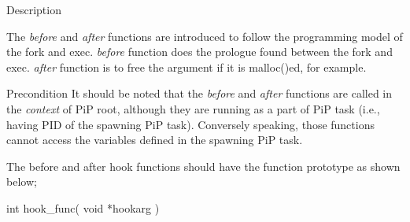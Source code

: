 \documentclass[twoside]{book}
\begin{document}
\begin{DoxyParagraph}{Description}

\end{DoxyParagraph}
The {\itshape before} and {\itshape after} functions are introduced to follow the programming model of the {\ttfamily fork} and {\ttfamily exec}. {\itshape before} function does the prologue found between the {\ttfamily fork} and {\ttfamily exec}. {\itshape after} function is to free the argument if it is {\ttfamily malloc()ed}, for example. \begin{DoxyPrecond}{Precondition}
It should be noted that the {\itshape before} and {\itshape after} functions are called in the {\itshape context} of Pi\-P root, although they are running as a part of Pi\-P task (i.\-e., having P\-I\-D of the spawning Pi\-P task). Conversely speaking, those functions cannot access the variables defined in the spawning Pi\-P task. 

The before and after hook functions should have the function prototype as shown below; 
\begin{DoxyCode}
\textcolor{keywordtype}{int} hook\_func( \textcolor{keywordtype}{void} *hookarg )
\end{DoxyCode}

\end{DoxyPrecond}
\end{document}
